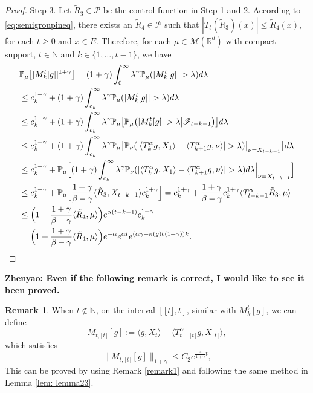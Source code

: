\documentclass[12pt, a4paper]{amsart}
\theoremstyle{definition}
\newtheorem{rem}[thm]{Remark}
\numberwithin{equation}{section}
\begin{document}
\begin{proof}
    Step 3. 
    Let $\tilde R_3\in \mathcal P$ be the control function in Step 1 and 2. According to \eqref{eq:semigroupineq}, there exists an $\tilde R_4\in \mathcal P$ such that
$
    |T_t(\tilde R_3)(x)| 
    \leq \tilde R_4(x),
$
    for each $t\geq 0$ and $x\in E$.
    Therefore, for each $\mu \in \mathcal M(\mathbb R^d)$ with compact support, $t\in \mathbb N$ and $k \in \{1,\dots,t-1\}$, we have
\begin{align}
    &\mathbb P_\mu\big[|M_k^t[g]|^{1+\gamma}\big] = (1+\gamma)\int_0^\infty \lambda^{\gamma} \mathbb P_{\mu}(|M_k^t[g]|>\lambda) d\lambda
    \\&\leq c_k^{1+\gamma}+(1+\gamma)\int_{c_k}^\infty \lambda^{\gamma}\mathbb P_\mu(|M_k^t[g]|> \lambda) d\lambda
    \\&\leq c_k^{1+\gamma}+(1+\gamma)\int_{c_k}^\infty \lambda^{\gamma}\mathbb P_\mu \big[\mathbb P_\mu\big(|M_k^t[g]|> \lambda\big| \mathscr F_{t-k-1}\big)\big] d\lambda
    \\&\leq c_k^{1+\gamma}+(1+\gamma)\int_{c_k}^\infty \lambda^{\gamma}\mathbb P_\mu \big[\mathbb P_\nu(|\langle T_k^\alpha g,X_1\rangle - \langle T_{k+1}^\alpha g, \nu\rangle|> \lambda)\big|_{\nu=X_{t-k-1}}\big] d\lambda
    \\&\leq c_k^{1+\gamma}+\mathbb P_\mu\Big[(1+\gamma)\int_{c_k}^\infty \lambda^{\gamma} \mathbb P_\nu(|\langle T_k^\alpha g,X_1\rangle - \langle T_{k+1}^\alpha g, \nu\rangle|> \lambda) d\lambda\Big|_{\nu=X_{t-k-1}}\Big]
    \\&\leq c_k^{1+\gamma}+\mathbb P_\mu\Big[\frac{1+\gamma}{\beta- \gamma}\langle \tilde R_3,X_{t-k-1}\rangle c_k^{1+\gamma}\Big]
    = c_k^{1+\gamma}+\frac{1+\gamma}{\beta- \gamma}c_k^{1+\gamma} \langle T_{t-k-1}^{\alpha}\tilde R_3,\mu\rangle
    \\&\leq \Big(1+ \frac{1+\gamma}{\beta - \gamma} \langle \tilde R_4,\mu\rangle\Big) e^{\alpha(t-k-1)}c_k^{1+\gamma}
    \\&= \Big(1+ \frac{1+\gamma}{\beta - \gamma} \langle \tilde R_4,\mu\rangle\Big)e^{-\alpha} e^{\alpha t}e^{(\alpha \gamma - \kappa(g)b(1+\gamma))k}.
\qedhere
\end{align}
\end{proof}
    {\bf Zhenyao: Even if the following remark is correct, I would like to see it been proved.}
\begin{rem}\label{remark2}
   When $t\notin \mathbb{N}$, on the interval $[\lfloor t \rfloor , t]$, similar with $M_k^t[g]$, we can define
   $$M_{t,\lfloor t \rfloor}[g]:=\langle g,X_t\rangle-\langle T^{\alpha}_{t-\lfloor t \rfloor}g,X_{\lfloor t \rfloor}\rangle,$$
   which satisfies
   $$\|M_{t,\lfloor t \rfloor}[g]\|_{1+\gamma}\leq C_2 e^{\frac{\alpha}{1+\gamma}t},$$
This can be proved by using Remark \ref{remark1} and following the same method in Lemma \ref{lem: lemma23}.
\end{rem}
\end{document}
